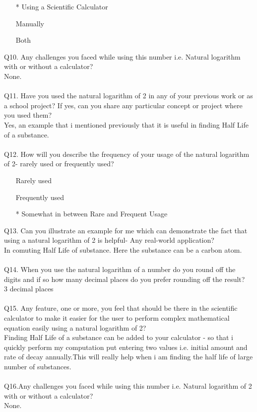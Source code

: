 \documentclass[12pt]{article}
\makeatletter
\newcommand*{\radiobutton}{%
  \@ifstar{\@radiobutton0}{\@radiobutton1}%
}
\newcommand*{\@radiobutton}[1]{%
  \begin{tikzpicture}
    \pgfmathsetlengthmacro\radius{height("X")/2}
    \draw[radius=\radius] circle;
    \ifcase#1 \fill[radius=.6*\radius] circle;\fi
  \end{tikzpicture}%
}
\makeatother
\begin{document}
\begin{itemize}
\item[\radiobutton*] Using a Scientific Calculator
\item[\radiobutton] Manually
\item[\radiobutton] Both
\end{itemize}
Q10. Any challenges you faced while using this number i.e. Natural logarithm with or without a calculator?\\
None.\\\\
Q11. Have you used the natural logarithm of 2 in any of your previous work or as a school project? If yes, can you share any particular concept or project where you used them?\\
Yes, an example that i mentioned previously that it is useful in finding Half Life of a substance.\\\\
Q12. How will you describe the frequency of your usage of the natural logarithm of 2- rarely used or frequently used?\\
\begin{itemize}
\item[\radiobutton] Rarely used
\item[\radiobutton] Frequently used
\item[\radiobutton*] Somewhat in between Rare and Frequent Usage
\end{itemize}
Q13. Can you illustrate an example for me which can demonstrate the fact that using a natural logarithm of 2 is helpful- Any real-world application?\\
In comuting Half Life of substance. Here the substance can be a carbon atom.\\\\
Q14. When you use the natural logarithm of a number do you round off the digits and if so how many decimal places do you prefer rounding off the result? \\
3 decimal places\\\\
Q15. Any feature, one or more, you feel that should be there in the scientific calculator to make it easier for the user to perform complex mathematical equation easily using a natural logarithm of 2?\\
Finding Half Life of a substance can be added to your calculator - so that i quickly perform my computation put entering two values i.e. initial amount and rate of decay annually.This will really help when i am finding the half life of large number of substances.\\\\
Q16.Any challenges you faced while using this number i.e. Natural logarithm of 2 with or without a calculator?\\
None.
\end{document}
